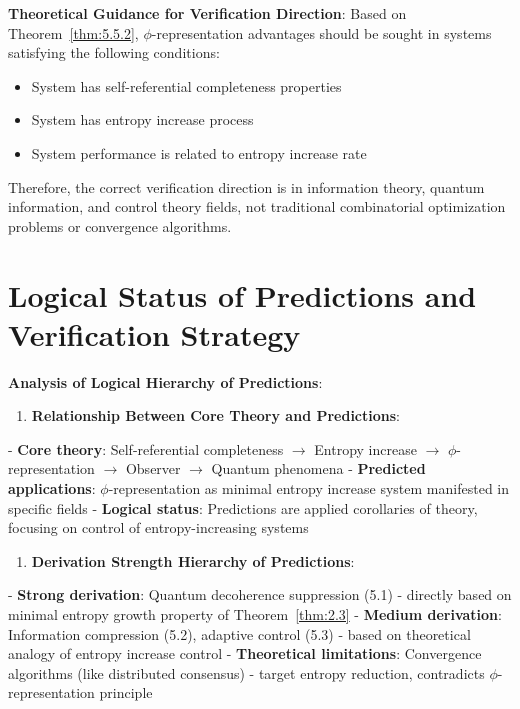 \textbf{Theoretical Guidance for Verification Direction}:
Based on Theorem~\ref{thm:5.5.2}, $\phi$-representation advantages should be sought in systems satisfying the following conditions:

\begin{itemize}
\item System has self-referential completeness properties
\item System has entropy increase process
\item System performance is related to entropy increase rate
\end{itemize}

Therefore, the correct verification direction is in information theory, quantum information, and control theory fields, not traditional combinatorial optimization problems or convergence algorithms.

\section{Logical Status of Predictions and Verification Strategy}
\label{sec:ch05_applications:logical-status-of-predictions-and-verification-strategy}

\textbf{Analysis of Logical Hierarchy of Predictions}:

\begin{enumerate}
\item \textbf{Relationship Between Core Theory and Predictions}:
\end{enumerate}
   - \textbf{Core theory}: Self-referential completeness $\rightarrow$ Entropy increase $\rightarrow$ $\phi$-representation $\rightarrow$ Observer $\rightarrow$ Quantum phenomena
   - \textbf{Predicted applications}: $\phi$-representation as minimal entropy increase system manifested in specific fields
   - \textbf{Logical status}: Predictions are applied corollaries of theory, focusing on control of entropy-increasing systems

\begin{enumerate}
\item \textbf{Derivation Strength Hierarchy of Predictions}:
\end{enumerate}
   - \textbf{Strong derivation}: Quantum decoherence suppression (5.1) - directly based on minimal entropy growth property of Theorem~\ref{thm:2.3}
   - \textbf{Medium derivation}: Information compression (5.2), adaptive control (5.3) - based on theoretical analogy of entropy increase control
   - \textbf{Theoretical limitations}: Convergence algorithms (like distributed consensus) - target entropy reduction, contradicts $\phi$-representation principle
   
